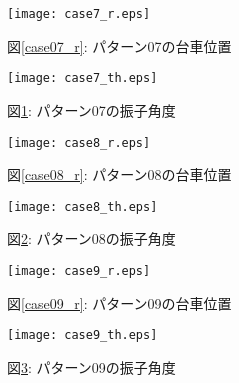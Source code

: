 \begin{figure}[htbp]
    \begin{minipage}{0.5\hsize}
        \begin{center}
            \texttt{[image: case7\_r.eps]}
            \caption{図\ref{case07_r}: パターン07の台車位置}
            \label{case07_r}
        \end{center}
    \end{minipage}
    \begin{minipage}{0.5\hsize}
        \begin{center}
            \texttt{[image: case7\_th.eps]}
            \caption{図\ref{case07_th}: パターン07の振子角度}
            \label{case07_th}
        \end{center}
    \end{minipage}
\end{figure}

\begin{figure}[htbp]
    \begin{minipage}{0.5\hsize}
        \begin{center}
            \texttt{[image: case8\_r.eps]}
            \caption{図\ref{case08_r}: パターン08の台車位置}
            \label{case08_r}
        \end{center}
    \end{minipage}
    \begin{minipage}{0.5\hsize}
        \begin{center}
            \texttt{[image: case8\_th.eps]}
            \caption{図\ref{case08_th}: パターン08の振子角度}
            \label{case08_th}
        \end{center}
    \end{minipage}
\end{figure}

\begin{figure}[htbp]
    \begin{minipage}{0.5\hsize}
        \begin{center}
            \texttt{[image: case9\_r.eps]}
            \caption{図\ref{case09_r}: パターン09の台車位置}
            \label{case09_r}
        \end{center}
    \end{minipage}
    \begin{minipage}{0.5\hsize}
        \begin{center}
            \texttt{[image: case9\_th.eps]}
            \caption{図\ref{case09_th}: パターン09の振子角度}
            \label{case09_th}
        \end{center}
    \end{minipage}
\end{figure}

